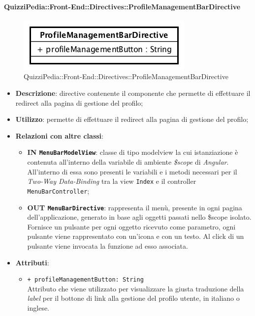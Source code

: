\paragraph{QuizziPedia::Front-End::Directives::ProfileManagementBarDirective}
\label{QuizziPedia::Front-End::Directives::ProfileManagementBarDirective}
\begin{figure} [ht]
	\centering
	\includegraphics[scale=0.80]{UML/Classi/Front-End/QuizziPedia_Front-end_Directives_ProfileManagementBarDirective.png}
	\caption{QuizziPedia::Front-End::Directives::ProfileManagementBarDirective}
\end{figure} \FloatBarrier
\begin{itemize}
	\item \textbf{Descrizione}: directive contenente il componente che permette di effettuare il redirect alla pagina di gestione del profilo;
	\item \textbf{Utilizzo}: permette di effettuare il redirect alla pagina di gestione del profilo;
	\item \textbf{Relazioni con altre classi}:
	\begin{itemize}
		\item \textbf{IN \texttt{MenuBarModelView}}: classe di tipo modelview la cui istanziazione è contenuta all'interno della variabile di ambiente \textit{\$scope} di \textit{Angular}. All'interno di essa sono presenti le variabili e i metodi necessari per il \textit{Two-Way Data-Binding} tra la view \texttt{Index} e il controller \texttt{MenuBarController};
		\item \textbf{OUT \texttt{MenuBarDirective}}: rappresenta il menù, presente in ogni pagina dell'applicazione, generato in base agli oggetti passati nello \$scope isolato. Fornisce un pulsante per ogni oggetto ricevuto come parametro, ogni pulsante viene rappresentato con un’icona e con un testo. Al click di un pulsante viene invocata la funzione ad esso associata.  
	\end{itemize}
	\item \textbf{Attributi}:
	\begin{itemize}
		\item \texttt{+ profileManagementButton: String} \\ Attributo che viene utilizzato per visualizzare la giusta traduzione della \textit{label} per il bottone di link alla gestione del profilo utente, in italiano o inglese.
	\end{itemize}
\end{itemize}